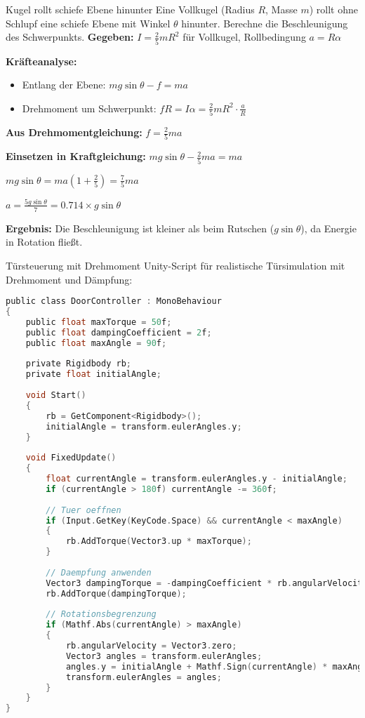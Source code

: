 \begin{example2}{Kugel rollt schiefe Ebene hinunter}
    Eine Vollkugel (Radius $R$, Masse $m$) rollt ohne Schlupf eine schiefe Ebene mit Winkel $\theta$ hinunter. Berechne die Beschleunigung des Schwerpunkts.
    \tcblower
    \textbf{Gegeben:} $I = \frac{2}{5}mR^2$ für Vollkugel, Rollbedingung $a = R\alpha$
    
    \textbf{Kräfteanalyse:}
    \begin{itemize}
        \item Entlang der Ebene: $mg\sin\theta - f = ma$
        \item Drehmoment um Schwerpunkt: $fR = I\alpha = \frac{2}{5}mR^2 \cdot \frac{a}{R}$
    \end{itemize}
    
    \textbf{Aus Drehmomentgleichung:} $f = \frac{2}{5}ma$
    
    \textbf{Einsetzen in Kraftgleichung:}
    $mg\sin\theta - \frac{2}{5}ma = ma$
    
    $mg\sin\theta = ma(1 + \frac{2}{5}) = \frac{7}{5}ma$
    
    $a = \frac{5g\sin\theta}{7} = 0.714 \times g\sin\theta$
    
    \textbf{Ergebnis:} Die Beschleunigung ist kleiner als beim Rutschen ($g\sin\theta$), da Energie in Rotation fließt.
\end{example2}

\begin{example2}{Türsteuerung mit Drehmoment}
    Unity-Script für realistische Türsimulation mit Drehmoment und Dämpfung:
    \tcblower
\begin{lstlisting}[language=C, style=basesmol]
public class DoorController : MonoBehaviour 
{
    public float maxTorque = 50f;
    public float dampingCoefficient = 2f;
    public float maxAngle = 90f;
    
    private Rigidbody rb;
    private float initialAngle;
    
    void Start() 
    {
        rb = GetComponent<Rigidbody>();
        initialAngle = transform.eulerAngles.y;
    }
    
    void FixedUpdate() 
    {
        float currentAngle = transform.eulerAngles.y - initialAngle;
        if (currentAngle > 180f) currentAngle -= 360f;
        
        // Tuer oeffnen
        if (Input.GetKey(KeyCode.Space) && currentAngle < maxAngle) 
        {
            rb.AddTorque(Vector3.up * maxTorque);
        }
        
        // Daempfung anwenden
        Vector3 dampingTorque = -dampingCoefficient * rb.angularVelocity;
        rb.AddTorque(dampingTorque);
        
        // Rotationsbegrenzung
        if (Mathf.Abs(currentAngle) > maxAngle) 
        {
            rb.angularVelocity = Vector3.zero;
            Vector3 angles = transform.eulerAngles;
            angles.y = initialAngle + Mathf.Sign(currentAngle) * maxAngle;
            transform.eulerAngles = angles;
        }
    }
}
\end{lstlisting}
\end{example2}

